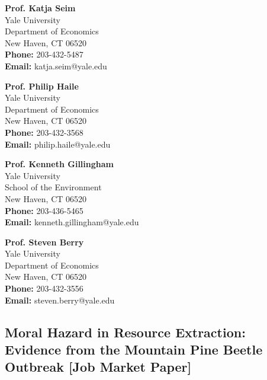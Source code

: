 \documentclass[11pt,letterpaper]{article}
\begin{document}
\begin{minipage}[t]{0.48\textwidth}
\textbf{Prof. Katja Seim} \\
Yale University \\
Department of Economics \\
New Haven, CT 06520 \\
\textbf{Phone:} 203-432-5487 \\
\textbf{Email:} katja.seim@yale.edu
\end{minipage}
\hfill
\begin{minipage}[t]{0.48\textwidth}
\textbf{Prof. Philip Haile} \\
Yale University \\
Department of Economics \\
New Haven, CT 06520 \\
\textbf{Phone:} 203-432-3568 \\
\textbf{Email:} philip.haile@yale.edu
\end{minipage}

\vspace{12pt}

\begin{minipage}[t]{0.48\textwidth}
\textbf{Prof. Kenneth Gillingham} \\
Yale University \\
School of the Environment \\
New Haven, CT 06520 \\
\textbf{Phone:} 203-436-5465 \\
\textbf{Email:} kenneth.gillingham@yale.edu
\end{minipage}
\hfill
\begin{minipage}[t]{0.48\textwidth}
\textbf{Prof. Steven Berry} \\
Yale University \\
Department of Economics \\
New Haven, CT 06520 \\
\textbf{Phone:} 203-432-3556 \\
\textbf{Email:} steven.berry@yale.edu
\end{minipage}

\newpage

\subsection*{Moral Hazard in Resource Extraction: Evidence from the Mountain Pine Beetle Outbreak [Job Market Paper]}
\end{document}
